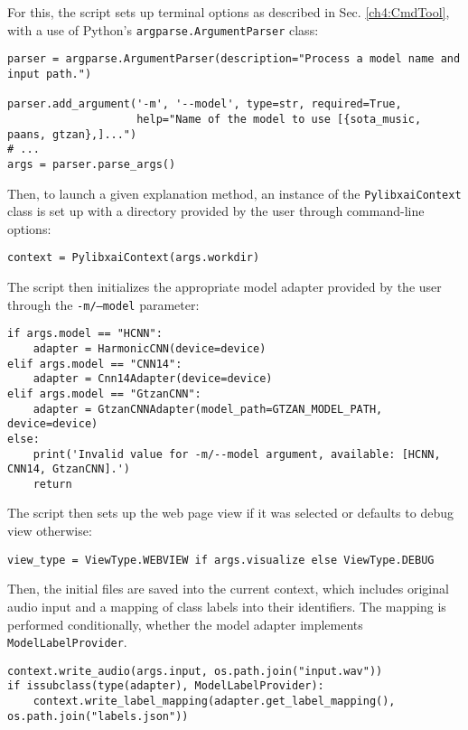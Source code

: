 \documentclass[
    bindingoffset=5mm,  %
    footnoteindent=3mm, %
    hyphenation=true    %
]{src/wut-thesis}
\begin{document}
For this, the script sets up terminal options as described in Sec. \ref{ch4:CmdTool}, with a use of Python's \texttt{argparse.ArgumentParser} class:
\begin{verbatim}
parser = argparse.ArgumentParser(description="Process a model name and input path.")
    
parser.add_argument('-m', '--model', type=str, required=True,
                    help="Name of the model to use [{sota_music, paans, gtzan},]...")
# ...
args = parser.parse_args()
\end{verbatim}

Then, to launch a given explanation method, an instance of the \texttt{PylibxaiContext} class
is set up with a directory provided by the user through command-line options:

\begin{verbatim}
context = PylibxaiContext(args.workdir)
\end{verbatim}

The script then initializes the appropriate model adapter provided by the user through the \texttt{-m/--model} parameter: 
\begin{verbatim}
if args.model == "HCNN":
    adapter = HarmonicCNN(device=device)
elif args.model == "CNN14":
    adapter = Cnn14Adapter(device=device)
elif args.model == "GtzanCNN":
    adapter = GtzanCNNAdapter(model_path=GTZAN_MODEL_PATH, device=device)
else:
    print('Invalid value for -m/--model argument, available: [HCNN, CNN14, GtzanCNN].')
    return
\end{verbatim}

The script then sets up the web page view if it was selected or defaults to debug view otherwise: 
\begin{verbatim}
view_type = ViewType.WEBVIEW if args.visualize else ViewType.DEBUG
\end{verbatim}

Then, the initial files are saved into the current context, which includes original audio input
and a mapping of class labels into their identifiers. The mapping is performed conditionally,
whether the model adapter implements \texttt{ModelLabelProvider}.

\begin{verbatim}
context.write_audio(args.input, os.path.join("input.wav"))
if issubclass(type(adapter), ModelLabelProvider):
    context.write_label_mapping(adapter.get_label_mapping(), os.path.join("labels.json"))
\end{verbatim}
\end{document}
